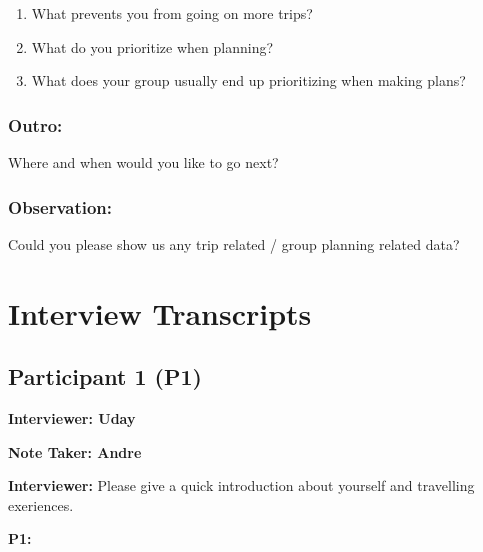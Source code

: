 \documentclass[12pt,a4paper]{article}
\begin{document}
\begin{enumerate}
\begin{enumerate}
        \item How are finances managed during trips?
        \item After the trip, are there any activities/organizational things your group does to “conclude the trip”?
        \begin{enumerate}
            \item How are total finances managed after the trip?
            \item How are photos managed after the trip?
        \end{enumerate}
    \end{enumerate}
    \item What prevents you from going on more trips?
    \item What do you prioritize when planning?
    \item What does your group usually end up prioritizing when making plans?
\end{enumerate}

\subsubsection*{Outro: }

Where and when would you like to go next?

\subsubsection*{Observation: }

Could you please show us any trip related / group planning related data?


\section{Interview Transcripts}
\label{app:transcripts}
\subsection{Participant 1 (P1)}

\textbf{Interviewer: Uday}

\textbf{Note Taker: Andre}

\textbf{Interviewer:} Please give a quick introduction about yourself and travelling exeriences. 

\textbf{P1:} 
\end{document}
